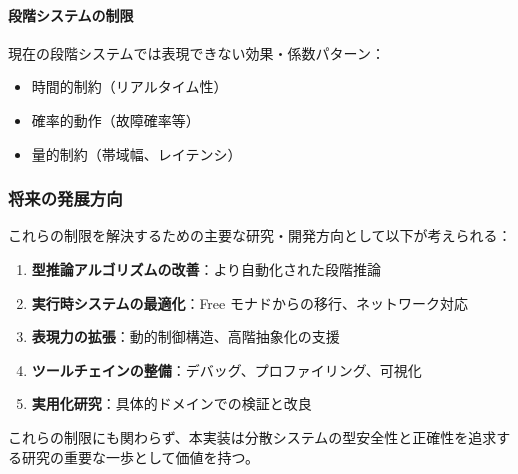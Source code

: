 \paragraph{段階システムの制限}
現在の段階システムでは表現できない効果・係数パターン：
\begin{itemize}
\item 時間的制約（リアルタイム性）
\item 確率的動作（故障確率等）
\item 量的制約（帯域幅、レイテンシ）
\end{itemize}

\subsubsection{将来の発展方向}

これらの制限を解決するための主要な研究・開発方向として以下が考えられる：
\begin{enumerate}
\item \textbf{型推論アルゴリズムの改善}：より自動化された段階推論
\item \textbf{実行時システムの最適化}：Free モナドからの移行、ネットワーク対応
\item \textbf{表現力の拡張}：動的制御構造、高階抽象化の支援
\item \textbf{ツールチェインの整備}：デバッグ、プロファイリング、可視化
\item \textbf{実用化研究}：具体的ドメインでの検証と改良
\end{enumerate}

これらの制限にも関わらず、本実装は分散システムの型安全性と正確性を追求する研究の重要な一歩として価値を持つ。

